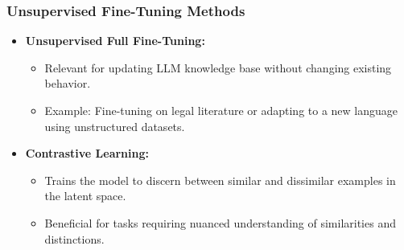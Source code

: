 \begin{frame}[fragile]\frametitle{Unsupervised Fine-Tuning Methods}

\begin{itemize}
\item \textbf{Unsupervised Full Fine-Tuning:}
  \begin{itemize}
	\item Relevant for updating LLM knowledge base without changing existing behavior.
	\item Example: Fine-tuning on legal literature or adapting to a new language using unstructured datasets.
  \end{itemize}
\item \textbf{Contrastive Learning:}
  \begin{itemize}
	\item Trains the model to discern between similar and dissimilar examples in the latent space.
	\item Beneficial for tasks requiring nuanced understanding of similarities and distinctions.
  \end{itemize}
\end{itemize}
\end{frame}

